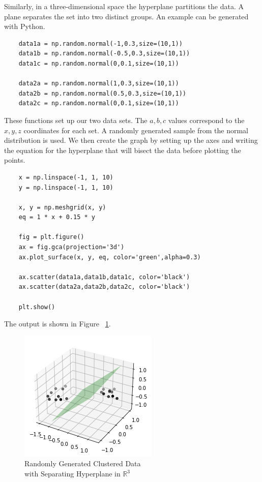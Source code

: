 \documentclass[12pt]{article}
\newcommand{\R}{\mathbb{R}}
\begin{document}
Similarly, in a three-dimensional space the hyperplane partitions the data. A plane separates the set into two distinct groups. An example can be generated with Python. 

\begin{verbatim}
    data1a = np.random.normal(-1,0.3,size=(10,1))
    data1b = np.random.normal(-0.5,0.3,size=(10,1))
    data1c = np.random.normal(0,0.1,size=(10,1))

    data2a = np.random.normal(1,0.3,size=(10,1))
    data2b = np.random.normal(0.5,0.3,size=(10,1))
    data2c = np.random.normal(0,0.1,size=(10,1))
\end{verbatim}

These functions set up our two data sets. The $a, b, c$ values correspond to the $x,y,z$ coordinates for each set. A randomly generated sample from the normal distribution is used. We then create the graph by setting up the axes and writing the equation for the hyperplane that will bisect the data before plotting the points.

\begin{verbatim}
    x = np.linspace(-1, 1, 10)
    y = np.linspace(-1, 1, 10)

    x, y = np.meshgrid(x, y)
    eq = 1 * x + 0.15 * y

    fig = plt.figure()
    ax = fig.gca(projection='3d')
    ax.plot_surface(x, y, eq, color='green',alpha=0.3)

    ax.scatter(data1a,data1b,data1c, color='black')
    ax.scatter(data2a,data2b,data2c, color='black')

    plt.show()
\end{verbatim}

The output is shown in Figure ~\ref{fig_randomly_generated_R3}.

\begin{figure}[ht]
    \centering
    \includegraphics{Figures/randomly_generated_R3.png}
    \caption{Randomly Generated Clustered Data \\ with Separating Hyperplane in $\R^3$}
    \label{fig_randomly_generated_R3}
\end{figure}
\end{document}

